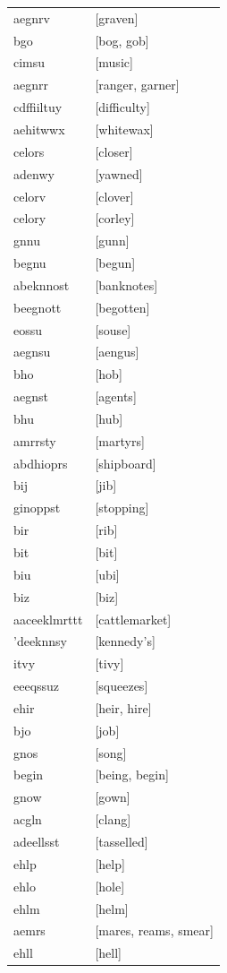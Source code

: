 \documentclass{article}
\begin{document}
\begin{tabular}{ll}
aegnrv & [graven] \\
bgo & [bog, gob] \\
cimsu & [music] \\
aegnrr & [ranger, garner] \\
cdffiiltuy & [difficulty] \\
aehitwwx & [whitewax] \\
celors & [closer] \\
adenwy & [yawned] \\
celorv & [clover] \\
celory & [corley] \\
gnnu & [gunn] \\
begnu & [begun] \\
abeknnost & [banknotes] \\
beegnott & [begotten] \\
eossu & [souse] \\
aegnsu & [aengus] \\
bho & [hob] \\
aegnst & [agents] \\
bhu & [hub] \\
amrrsty & [martyrs] \\
abdhioprs & [shipboard] \\
bij & [jib] \\
ginoppst & [stopping] \\
bir & [rib] \\
bit & [bit] \\
biu & [ubi] \\
biz & [biz] \\
aaceeklmrttt & [cattlemarket] \\
'deeknnsy & [kennedy's] \\
itvy & [tivy] \\
eeeqssuz & [squeezes] \\
ehir & [heir, hire] \\
bjo & [job] \\
gnos & [song] \\
begin & [being, begin] \\
gnow & [gown] \\
acgln & [clang] \\
adeellsst & [tasselled] \\
ehlp & [help] \\
ehlo & [hole] \\
ehlm & [helm] \\
aemrs & [mares, reams, smear] \\
ehll & [hell] \\

\end{tabular}
\end{document}
